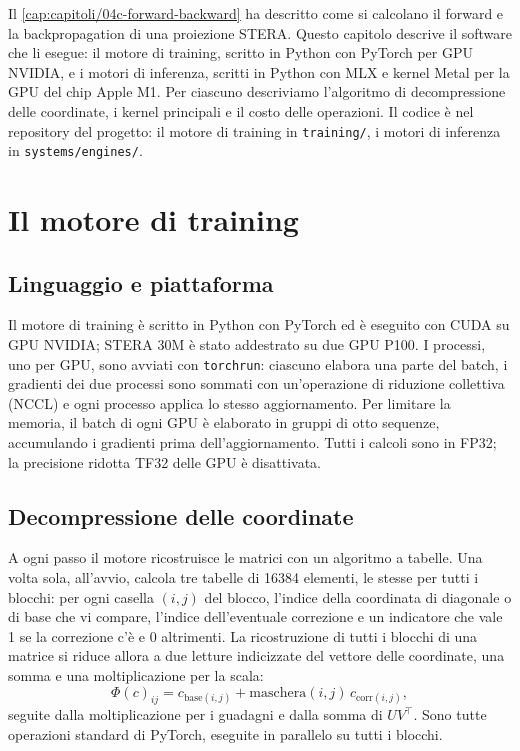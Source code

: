 Il \autoref{cap:capitoli/04c-forward-backward} ha descritto come si calcolano il forward e la backpropagation di una proiezione STERA. Questo capitolo descrive il software che li esegue: il motore di training, scritto in Python con PyTorch per GPU NVIDIA, e i motori di inferenza, scritti in Python con MLX e kernel Metal per la GPU del chip Apple M1. Per ciascuno descriviamo l'algoritmo di decompressione delle coordinate, i kernel principali e il costo delle operazioni. Il codice è nel repository del progetto: il motore di training in \texttt{training/}, i motori di inferenza in \texttt{systems/engines/}.

\section{Il motore di training}
\label{sec:motore-training}

\subsection{Linguaggio e piattaforma}
Il motore di training è scritto in Python con PyTorch ed è eseguito con CUDA su GPU NVIDIA; STERA 30M è stato addestrato su due GPU P100. I processi, uno per GPU, sono avviati con \texttt{torchrun}: ciascuno elabora una parte del batch, i gradienti dei due processi sono sommati con un'operazione di riduzione collettiva (NCCL) e ogni processo applica lo stesso aggiornamento. Per limitare la memoria, il batch di ogni GPU è elaborato in gruppi di otto sequenze, accumulando i gradienti prima dell'aggiornamento. Tutti i calcoli sono in FP32; la precisione ridotta TF32 delle GPU è disattivata.

\subsection{Decompressione delle coordinate}
\label{sec:ricostruzione-training}
A ogni passo il motore ricostruisce le matrici con un algoritmo a tabelle. Una volta sola, all'avvio, calcola tre tabelle di \num{16384} elementi, le stesse per tutti i blocchi: per ogni casella $(i,j)$ del blocco, l'indice della coordinata di diagonale o di base che vi compare, l'indice dell'eventuale correzione e un indicatore che vale 1 se la correzione c'è e 0 altrimenti. La ricostruzione di tutti i blocchi di una matrice si riduce allora a due letture indicizzate del vettore delle coordinate, una somma e una moltiplicazione per la scala:
\[
\Phi(c)_{ij}=c_{\mathrm{base}(i,j)}+\mathrm{maschera}(i,j)\,c_{\mathrm{corr}(i,j)} ,
\]
seguite dalla moltiplicazione per i guadagni e dalla somma di $UV^\top$. Sono tutte operazioni standard di PyTorch, eseguite in parallelo su tutti i blocchi.

